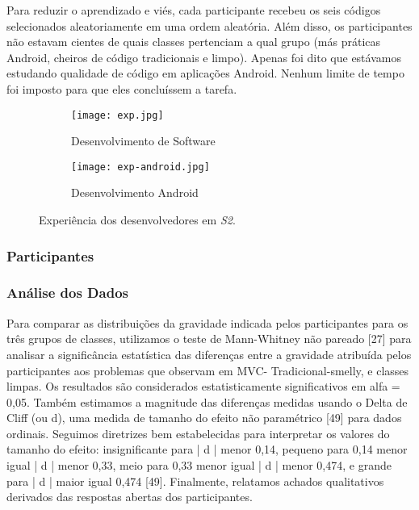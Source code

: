 Para reduzir o aprendizado e viés, cada participante recebeu os seis códigos selecionados aleatoriamente em uma ordem aleatória. Além disso, os participantes não estavam cientes de quais classes pertenciam a qual grupo (más práticas Android, cheiros de código tradicionais e limpo). Apenas foi dito que estávamos estudando qualidade de código em aplicações Android. Nenhum limite de tempo foi imposto para que eles concluíssem a tarefa.

\begin{figure*}[!t]
\centering
\begin{subfigure}{.5\textwidth}
 \centering
 \texttt{[image: exp.jpg]}
 \caption{Desenvolvimento de Software}
 \label{fig:sub1}
\end{subfigure}%
\begin{subfigure}{.5\textwidth}
 \centering
 \texttt{[image: exp-android.jpg]}
 \caption{Desenvolvimento Android}
 \label{fig:sub2}
\end{subfigure}
\caption{Experiência dos desenvolvedores em \textit{S2}.}
\label{fig:survey2-exp}
\end{figure*}

\subsubsection{Participantes}
\label{sub:perception-participants}


\subsubsection{Análise dos Dados}
\label{sub:perception-participants-analysis}

Para comparar as distribuições da gravidade indicada pelos participantes para os três grupos de classes, utilizamos o teste de Mann-Whitney não pareado [27] para analisar a significância estatística das diferenças entre a gravidade atribuída pelos participantes aos problemas que observam em MVC- Tradicional-smelly, e classes limpas. Os resultados são considerados estatisticamente significativos em alfa = 0,05. Também estimamos a magnitude das diferenças medidas usando o Delta de Cliff (ou d), uma medida de tamanho do efeito não paramétrico [49] para dados ordinais. Seguimos diretrizes bem estabelecidas para interpretar os valores do tamanho do efeito: insignificante para | d | menor 0,14, pequeno para 0,14 menor igual | d | menor 0,33, meio para 0,33 menor igual | d | menor 0,474, e grande para | d | maior igual 0,474 [49]. Finalmente, relatamos achados qualitativos derivados das respostas abertas dos participantes.

















